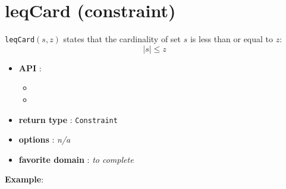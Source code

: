 \label{leqcard}
\hypertarget{leqcard}{}

\section{leqCard (constraint)}\label{leqcard:leqcardconstraint}\hypertarget{leqcard:leqcardconstraint}{}
\begin{notedef}
  \texttt{leqCard}$(s,z)$ states that the cardinality of set $s$ is less than or equal to $z$:
$$|s| \le z$$
\end{notedef}

\begin{itemize}
	\item \textbf{API} :
	\begin{itemize}
		\item {}
		\item {}
	\end{itemize}
	\item \textbf{return type} : \texttt{Constraint}
	\item \textbf{options} : \emph{n/a}
	\item \textbf{favorite domain} : \emph{to complete}
\end{itemize}

\textbf{Example}:

